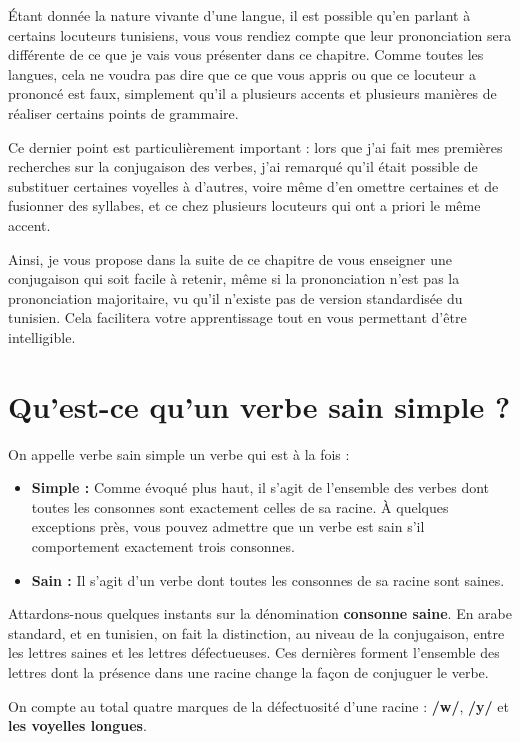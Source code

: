 Étant donnée la nature vivante d'une langue, il est possible qu'en parlant à certains locuteurs tunisiens, vous vous rendiez compte que leur prononciation sera différente de ce que je vais vous présenter dans ce chapitre. Comme toutes les langues, cela ne voudra pas dire que ce que vous appris ou que ce locuteur a prononcé est faux, simplement qu'il a plusieurs accents et plusieurs manières de réaliser certains points de grammaire. 

Ce dernier point est particulièrement important : lors que j'ai fait mes premières recherches sur la conjugaison des verbes, j'ai remarqué qu'il était possible de substituer certaines voyelles à d'autres, voire même d'en omettre certaines et de fusionner des syllabes, et ce chez plusieurs locuteurs qui ont a priori le même accent. 

Ainsi, je vous propose dans la suite de ce chapitre de vous enseigner une conjugaison qui soit facile à retenir, même si la prononciation n'est pas la prononciation majoritaire, vu qu'il n'existe pas de version standardisée du tunisien. Cela facilitera votre apprentissage tout en vous permettant d'être intelligible.

\section{Qu'est-ce qu'un verbe sain simple ?}
On appelle verbe sain simple un verbe qui est à la fois : 
\begin{itemize}
    \item \textbf{Simple :} Comme évoqué plus haut, il s'agit de l'ensemble des verbes dont toutes les consonnes sont exactement celles de sa racine. À quelques exceptions près, vous pouvez admettre que un verbe est sain s'il comportement exactement trois consonnes.
    \item \textbf{Sain :} Il s'agit d'un verbe dont toutes les consonnes de sa racine sont saines.
\end{itemize}

Attardons-nous quelques instants sur la dénomination \textbf{consonne saine}. En arabe standard, et en tunisien, on fait la distinction, au niveau de la conjugaison, entre les lettres saines et les lettres défectueuses. Ces dernières forment l'ensemble des lettres dont la présence dans une racine change la façon de conjuguer le verbe. 

On compte au total quatre marques de la défectuosité d'une racine : \textbf{/w/}, \textbf{/y/} et \textbf{les voyelles longues}. 

